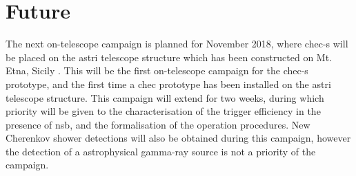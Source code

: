 \section{Future}

The next on-telescope campaign is planned for November 2018, where \gls{chec-s} will be placed on the \gls{astri} telescope structure which has been constructed on Mt. Etna, Sicily \cite{Maccarone2017}. This will be the first on-telescope campaign for the \gls{chec-s} prototype, and the first time a \gls{chec} prototype has been installed on the \gls{astri} telescope structure. This campaign will extend for two weeks, during which priority will be given to the characterisation of the trigger efficiency in the presence of \gls{nsb}, and the formalisation of the operation procedures. New Cherenkov shower detections will also be obtained during this campaign, however the detection of a astrophysical gamma-ray source is not a priority of the campaign.